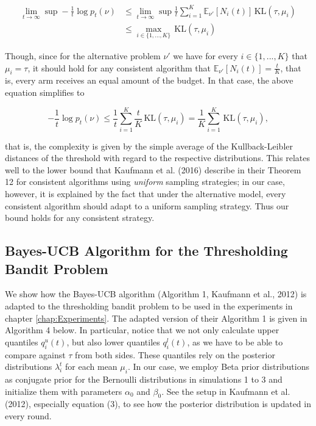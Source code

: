 \documentclass[11pt,]{article}
\newcommand{\KL}{\,\text{KL}}
\begin{document}
\begin{align*}
\lim_{t \rightarrow \infty} \sup - \frac{1}{t} \log p_t(\nu) & \leq \lim_{t \rightarrow \infty} \sup \frac{1}{t} \sum_{i=1}^K \mathbb{E}_{\nu'}[N_i(t)]\KL(\tau, \mu_i) \\
& \leq \max_{i \in \{1,...,K\}} \KL(\tau, \mu_i)
\end{align*}

Though, since for the alternative problem \(\nu'\) we have for every
\(i \in \{1,...,K\}\) that \(\mu_i = \tau\), it should hold for any
consistent algorithm that \(\mathbb{E}_{\nu'}[N_i(t)] = \frac{t}{K}\),
that is, every arm receives an equal amount of the budget. In that case,
the above equation simplifies to

\[
- \frac{1}{t} \log p_t(\nu) \leq \frac{1}{t} \sum_{i=1}^K \frac{t}{K}\KL(\tau, \mu_i) = \frac{1}{K} \sum_{i=1}^{K} \KL(\tau, \mu_i),
\]

that is, the complexity is given by the simple average of the
Kullback-Leibler distances of the threshold with regard to the
respective distributions. This relates well to the lower bound that
Kaufmann et al. (2016) describe in their Theorem 12 for consistent
algorithms using \emph{uniform} sampling strategies; in our case,
however, it is explained by the fact that under the alternative model,
every consistent algorithm should adapt to a uniform sampling strategy.
Thus our bound holds for any consistent strategy.

\subsection{\texorpdfstring{Bayes-UCB Algorithm for the Thresholding
Bandit Problem
\label{sec:AppendixBUCB}}{Bayes-UCB Algorithm for the Thresholding Bandit Problem }}\label{bayes-ucb-algorithm-for-the-thresholding-bandit-problem}

We show how the Bayes-UCB algorithm (Algorithm 1, Kaufmann et al., 2012)
is adapted to the thresholding bandit problem to be used in the
experiments in chapter \autoref{chap:Experiments}. The adapted version
of their Algorithm 1 is given in Algorithm 4 below. In particular,
notice that we not only calculate upper quantiles \(q_i^u(t)\), but also
lower quantiles \(q_i^l(t)\), as we have to be able to compare against
\(\tau\) from both sides. These quantiles rely on the posterior
distributions \(\lambda_i^t\) for each mean \(\mu_i\). In our case, we
employ Beta prior distributions as conjugate prior for the Bernoulli
distributions in simulations 1 to 3 and initialize them with parameters
\(\alpha_0\) and \(\beta_0\). See the setup in Kaufmann et al. (2012),
especially equation (3), to see how the posterior distribution is
updated in every round.
\end{document}
